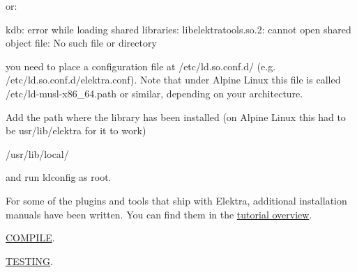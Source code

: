 or\+:


\begin{DoxyCode}
kdb: error while loading shared libraries:
     libelektratools.so.2: cannot open shared object file: No such file or directory
\end{DoxyCode}


you need to place a configuration file at {\ttfamily /etc/ld.so.\+conf.\+d/} (e.\+g. {\ttfamily /etc/ld.so.\+conf.\+d/elektra.conf}). Note that under Alpine Linux this file is called {\ttfamily /etc/ld-\/musl-\/x86\+\_\+64.path} or similar, depending on your architecture.

Add the path where the library has been installed (on Alpine Linux this had to be {\ttfamily usr/lib/elektra} for it to work)


\begin{DoxyCode}
/usr/lib/local/
\end{DoxyCode}


and run {\ttfamily ldconfig} as root.

For some of the plugins and tools that ship with Elektra, additional installation manuals have been written. You can find them in the \hyperlink{md_doc_tutorials_README_doc_tutorials_README_md}{tutorial overview}.


\begin{DoxyItemize}
\item \hyperlink{doc_COMPILE_md}{C\+O\+M\+P\+I\+LE}.
\item \hyperlink{doc_TESTING_md}{T\+E\+S\+T\+I\+NG}. 
\end{DoxyItemize}